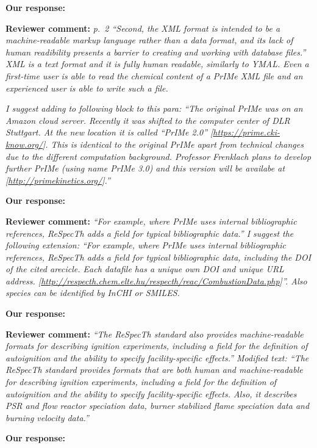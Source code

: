 \documentclass[a4paper,10pt]{elsarticle}
\begin{document}
\textbf{Our response:}



\textbf{Reviewer comment:}
\textit{p.~2 ``Second, the XML format is intended to be a machine-readable markup language rather than a data format, and its lack of human readibility presents a barrier to creating and working with database files.''
XML is a text format and it is fully human readable, similarly to YMAL. Even a first-time user is able to read the chemical content of a  PrIMe XML file and an experienced user is able to write such a file.}

\textit{I suggest adding to following block to this para: ``The original PrIMe was on an Amazon cloud server. Recently it was shifted to the computer center of DLR Stuttgart. At the new location it is called ``PrIMe 2.0'' [\url{https://prime.cki-know.org/}]. This is identical to the original PrIMe apart from technical changes due to the different computation background. Professor Frenklach plans to develop further PrIMe (using name PrIMe 3.0) and this version will be availabe at [\url{http://primekinetics.org/}].''
}

\textbf{Our response:}



\textbf{Reviewer comment:}
\textit{``For example, where PrIMe uses internal bibliographic references, ReSpecTh adds a field for typical bibliographic data.''
I suggest the following extension:
``For example, where PrIMe uses internal bibliographic references, ReSpecTh adds a field for typical bibliographic data, including the DOI of the cited arecicle. Each datafile has a unique own DOI and unique URL address. [\url{http://respecth.chem.elte.hu/respecth/reac/CombustionData.php}]''. Also species can be identified by InCHI or SMILES.
}

\textbf{Our response:}


\textbf{Reviewer comment:}
\textit{``The ReSpecTh standard also provides machine-readable formats for describing ignition experiments, including a field for the definition of autoignition and the ability to specify facility-specific effects.''
Modified text:
``The ReSpecTh standard provides formats that are both human and machine-readable for describing ignition experiments, including a field for the definition of autoignition and the ability to specify facility-specific effects. Also, it describes PSR and flow reactor speciation data, burner stabilized flame speciation data and burning velocity data.''
}

\textbf{Our response:}
\end{document}
